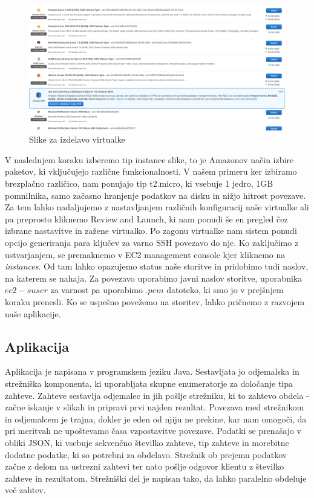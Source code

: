 \begin{figure}[H]
    \centering
    \includegraphics[scale=0.25]{Img/1_AWS_images.png}
    \caption{Slike za izdelavo virtualke}
    \label{fig:1_AWS_images}
\end{figure}

V naslednjem koraku izberemo tip instance slike, to je Amazonov način izbire paketov, ki vključujejo različne funkcionalnosti. V našem primeru ker izbiramo brezplačno različico, nam ponujajo tip t2.micro, ki vsebuje 1 jedro, 1GB pomnilnika, samo začasno hranjenje podatkov na disku in nižjo hitrost povezave. Za tem lahko nadaljujemo z nastavljanjem različnih konfiguracij naše virtualke ali pa preprosto kliknemo Review and Launch, ki nam ponudi še en pregled čez izbrane nastavitve in zažene virtualko. Po zagonu virtualke nam sistem ponudi opcijo generiranja para ključev za varno SSH povezavo do nje. Ko zaključimo z ustvarjanjem, se premaknemo v EC2 management console kjer kliknemo na \emph{instances}. Od tam lahko opazujemo status naše storitve in pridobimo tudi naslov, na katerem se nahaja. Za povezavo uporabimo javni naslov storitve, uporabnika $ec2-suser$ za varnost pa uporabimo $.pem$ datoteko, ki smo jo v prejšnjem koraku prenesli. Ko se uspešno povežemo na storitev, lahko pričnemo z razvojem naše aplikacije.

\subsection{Aplikacija}

Aplikacija je napisana v programskem jeziku Java. Sestavljata jo odjemalska in strežniška komponenta, ki uporabljata skupne enumeratorje za določanje tipa zahteve. Zahteve sestavlja odjemalec in jih pošlje strežniku, ki to zahtevo obdela - začne iskanje v slikah in pripravi prvi najden rezultat. Povezava med strežnikom in odjemalcem je trajna, dokler je eden od njiju ne prekine, kar nam omogoči, da pri meritvah ne upoštevamo časa vzpostavitve povezave. Podatki se prenašajo v obliki JSON, ki vsebuje sekvenčno številko zahteve, tip zahteve in morebitne dodatne podatke, ki so potrebni za obdelavo. Strežnik ob prejemu podatkov začne z delom na ustrezni zahtevi ter nato pošlje odgovor klientu z številko zahteve in rezultatom. Strežniški del je napisan tako, da lahko paralelno obdeluje več zahtev.

